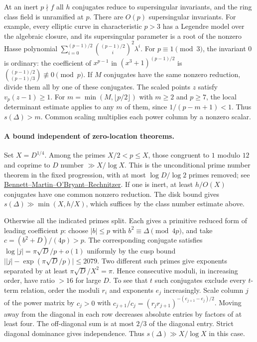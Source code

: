 At an inert $p\nmid f$ all $h$ conjugates reduce to supersingular
invariants, and the ring class field is unramified at $p$.
There are $O(p)$ supersingular invariants. For example, every elliptic curve
in characteristic $p>3$ has a Legendre model over the algebraic closure, and
its supersingular parameter is a root of the nonzero Hasse polynomial
$\sum_{i=0}^{(p-1)/2}\binom{(p-1)/2}{i}^{\!2}\lambda^i$.
For $p\equiv1\pmod3$, the invariant $0$ is ordinary: the coefficient of
$x^{p-1}$ in $(x^3+1)^{(p-1)/2}$ is
$\binom{(p-1)/2}{(p-1)/3}\not\equiv0\pmod p$.
If $M$ conjugates have the same nonzero reduction, divide them all by one
of these conjugates. The scaled points $z$ satisfy $v_p(z-1)\ge1$.
For $m=\min(M,\lfloor p/2\rfloor)$ with $m\ge2$ and $p\ge7$, the
local determinant estimate applies to any $m$ of them, since
$1/(p-m+1)<1$. Thus $s(\Delta)>m$. Common scaling multiplies each
power column by a nonzero scalar.

\paragraph{A bound independent of zero-location theorems.}
Set $X=D^{1/4}$. Among the primes $X/2<p\le X$, those congruent to $1$
modulo $12$ and coprime to $D$ number $\gg X/\log X$. This is the
unconditional prime number theorem in the fixed progression, with at most
$\log D/\log 2$ primes removed; see
\href{https://arxiv.org/abs/1802.00085}{Bennett--Martin--O'Bryant--Rechnitzer}.
If one is inert, at least $h/O(X)$ conjugates have one common nonzero
reduction. The disk bound gives $s(\Delta)\gg\min(X,h/X)$, which
suffices by the class number estimate above.

Otherwise all the indicated primes split. Each gives a primitive reduced
form of leading coefficient $p$: choose $|b|\le p$ with
$b^2\equiv \Delta\pmod{4p}$, and take $c=(b^2+D)/(4p)>p$.
The corresponding conjugate satisfies
$\log |j|=\pi\sqrt D/p+o(1)$ uniformly by the cusp bound
$\big||j|-\exp(\pi\sqrt D/p)\big|\le2079$.
Two different such primes give exponents separated by at least
$\pi\sqrt D/X^2=\pi$. Hence consecutive moduli, in increasing order,
have ratio $>16$ for large $D$. To see that $t$ such conjugates exclude
every $t$-term relation, order the moduli $r_i$ and exponents $e_j$
increasingly. Scale column $j$ of the power matrix by $c_j>0$ with
$c_{j+1}/c_j=(r_jr_{j+1})^{-(e_{j+1}-e_j)/2}$. Moving away from the
diagonal in each row decreases absolute entries by factors of at least
four. The off-diagonal sum is at most $2/3$ of the diagonal entry.
Strict diagonal dominance gives independence. Thus
$s(\Delta)\gg X/\log X$ in this case.

